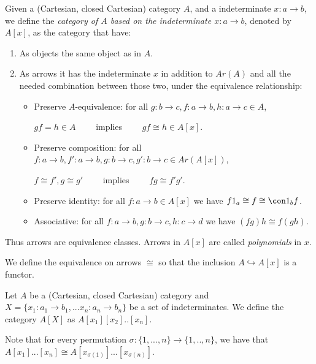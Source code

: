 \begin{definition}\cite[Part I, Chapter 5]{lambek1988introduction}
  Given a (Cartesian, closed Cartesian) category $A$, and a indeterminate $x: a \to b$, we define the \emph{category of $A$ based on the indeterminate $x:a\to b$}, denoted by $A[x]$, as the category that have:
  \begin{enumerate}
  \item As objects the same object as in $A$.
  \item As arrows it has the indeterminate $x$ in addition to $Ar(A)$ and all the needed combination between those two, under the equivalence relationship:
    \begin{itemize}
    \item Preserve   $A$-equivalence: for all $g:b\to c,f:a\to b, h: a\to c\in A$,
      \begin{center}
        $gf=h \in A\qquad $ implies $\qquad gf \cong h\in A[x].$
      \end{center}

    \item Preserve composition: for all $f:a\to b,f':a\to b,g:b\to c,g': b \to c\in Ar(A[x])$,
      \begin{center}
        $f\cong f', g\cong g'\qquad$ implies $\qquad fg\cong f'g'$.
      \end{center}
      
    \item Preserve identity: for all $f:a\to b\in A[x]$ we have $f1_a\cong f \cong \con 1_bf$.
    \item Associative: for all $f:a\to b, g:b\to c, h: c\to d$ we have $(fg)h\cong f(gh)$.
    \end{itemize}
  \end{enumerate}
  Thus arrows are equivalence classes. Arrows in $A[x]$ are called \emph{polynomials} in $x$.
\end{definition}
\begin{remark}
  We define the equivalence on arrows $\cong$ so that the inclusion $A\hookrightarrow A[x]$ is a functor.
\end{remark}
\begin{definition}
  Let $A$ be a (Cartesian, closed Cartesian) category and $X=\{x_1:a_1 \to b_1, ... x_n:a_n \to b_n\}$ be a set of indeterminates. We define the category $A[X]$ as $A[x_1][x_2]..[x_n]$.
\end{definition}
\begin{remark}
  Note that for every permutation $\sigma : \{1,...,n\}\to \{1,..,n\}$, we have that $A[x_1]...[x_n]\cong A[x_{\sigma(1)}]...[x_{\sigma(n)}]$. 
\end{remark}

